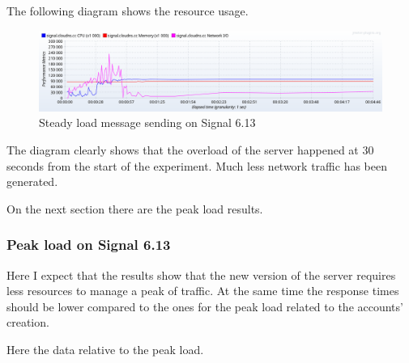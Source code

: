 \clearpage

The following diagram shows the resource usage.

\begin{figure}[H]
    \centering
    \includegraphics[width=\textwidth]{images/613/6.13-steady-message}
    \caption{Steady load message sending on Signal 6.13}
    \label{fig:signalbasemessageloadnew}
\end{figure}

The diagram clearly shows that the overload of the server happened at $30$ seconds from the start of the experiment. Much less network traffic has been generated.

On the next section there are the peak load results.

\subsubsection{Peak load on Signal 6.13}

Here I expect that the results show that the new version of the server requires less resources to manage a peak of traffic.
At the same time the response times should be lower compared to the ones for the peak load related to the accounts' creation.

Here the data relative to the peak load.

\begin{table}[H]
\caption{Peak load message sending on Signal 6.13}
\label{tab:peakloadmessage613}
\end{table}

